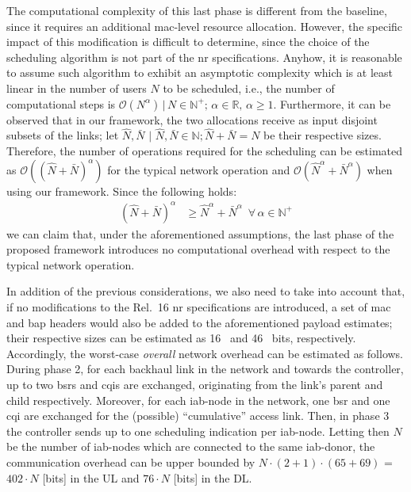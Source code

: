 The computational complexity of this last phase is different from the baseline, since it requires an additional \gls{mac}-level resource allocation. However, the specific impact of this modification is difficult to determine, since the choice of the scheduling algorithm is not part of the \gls{nr} specifications. Anyhow, it is reasonable to assume such algorithm to exhibit an asymptotic complexity which is at least linear in the number of users $N$ to be scheduled, i.e., the number of computational steps is $ \mathcal{O} \left( N^{\alpha} \right) \, | \, N \in \mathbb{N}^+ ; \, \alpha \in \mathbb{R}, \, \alpha \geq 1$. Furthermore, it can be observed that in our framework, the two allocations receive as input disjoint subsets of the links; let $\hat{N}, \bar{N} \,\, | \,\, \hat{N}, \bar{N} \in \mathbb{N}; \hat{N} + \bar{N} = N$ be their respective sizes. Therefore, 
the number of operations required for the scheduling can be estimated as $ \mathcal{O} \left( (\hat{N} + \bar{N})^{\alpha} \right)$ for the typical network operation and $ \mathcal{O} \left( \hat{N}^{\alpha} + \bar{N}^{\alpha} \right) $ when using our framework. Since the following holds:
\begin{align*}
(\hat{N} + \bar{N})^{\alpha} & \geq \hat{N}^{\alpha} + \bar{N}^{\alpha} \,\,\, \forall \, \alpha \in \mathbb{N}^+
\end{align*}
we can claim that, under the aforementioned assumptions, the last phase of the proposed framework introduces no computational overhead with respect to the typical network operation.

In addition of the previous considerations, we also need to take into account that, if no modifications to the Rel.~16 \gls{nr} specifications are introduced, a set of \gls{mac} and \gls{bap} headers would also be added to the aforementioned payload estimates; their respective sizes can be estimated as 16~\cite{3gpp_38_321} and 46~\cite{3gpp_38_340} bits, respectively. Accordingly, the worst-case \textit{overall} network overhead can be estimated as follows.
During phase 2, for each backhaul link in the network and towards the controller, up to two \glspl{bsr} and \glspl{cqi} are exchanged, originating from the link's parent and child respectively. Moreover, for each \gls{iab}-node in the network, one \gls{bsr} and one \gls{cqi} are exchanged for the (possible) ``cumulative'' access link. Then, in phase 3 the controller sends up to one scheduling indication per \gls{iab}-node. Letting then $N$ be the number of \gls{iab}-nodes which are connected to the same \gls{iab}-donor, the communication overhead can be upper bounded by $N \cdot (2 + 1) \cdot (65 + 69)$ = $402 \cdot N$ [bits] in the UL and $76 \cdot N$ [bits] in the DL.


